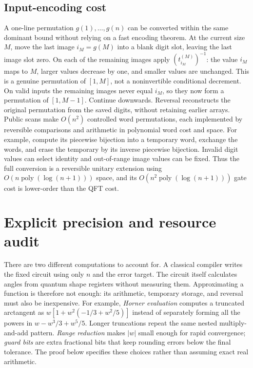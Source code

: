 \documentclass[11pt]{article}
\theoremstyle{definition}
\newcommand{\poly}{\operatorname{poly}}
\begin{document}
\subsection{Input-encoding cost}

A one-line permutation $g(1),\ldots,g(n)$ can be converted within the
same dominant bound without relying on a fast encoding theorem. At the
current size $M$, move the last image $i_M=g(M)$ into a blank digit slot,
leaving the last image slot zero. On each of the remaining images apply
$(t_{i_M}^{(M)})^{-1}$: the value $i_M$ maps to $M$, larger values decrease
by one, and smaller values are unchanged. This is a genuine permutation
of $[1,M]$, not a noninvertible conditional decrement. On valid inputs
the remaining images never equal $i_M$, so they now form a permutation
of $[1,M-1]$. Continue downwards. Reversal reconstructs the original
permutation from the saved digits, without retaining earlier arrays.
Public scans make $O(n^2)$ controlled word permutations, each implemented
by reversible comparisons and arithmetic in polynomial word cost and
space. For example, compute its piecewise bijection into a temporary word,
exchange the words, and erase the temporary by its inverse piecewise
bijection. Invalid digit values can select identity and out-of-range
image values can be fixed. Thus the full conversion is a reversible
unitary extension using $O(n\poly(\log(n+1)))$ space, and its
$O(n^2\poly(\log(n+1)))$ gate cost is lower-order than the QFT cost.

\section{Explicit precision and resource audit}\label{sec:explicitcosts}

There are two different computations to account for. A classical
compiler writes the fixed circuit using only $n$ and the error target.
The circuit itself calculates angles from quantum shape registers without
measuring them. Approximating a function is therefore not enough: its
arithmetic, temporary storage, and reversal must also be inexpensive.
For example, \emph{Horner evaluation} computes a truncated arctangent as
$w[1+w^2(-1/3+w^2/5)]$ instead of separately forming all the powers in
$w-w^3/3+w^5/5$. Longer truncations repeat the same nested multiply-and-add
pattern. \emph{Range reduction} makes $|w|$ small enough for rapid
convergence; \emph{guard bits} are extra fractional bits that keep
rounding errors below the final tolerance. The proof below specifies
these choices rather than assuming exact real arithmetic.
\end{document}
